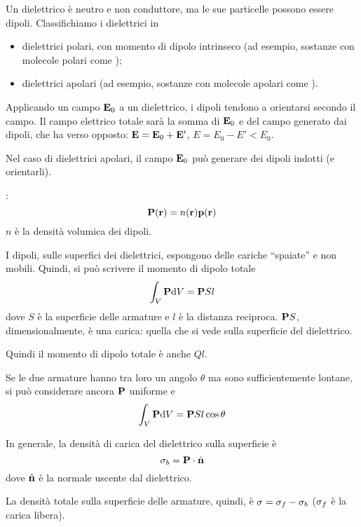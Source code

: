 Un dielettrico è neutro e non conduttore, ma le sue particelle possono essere dipoli.
Classifichiamo i dielettrici in
\begin{itemize}
    \item dielettrici polari, con momento di dipolo intrinseco (ad esempio, sostanze con molecole polari come );
    \item dielettrici apolari (ad esempio, sostanze con molecole apolari come ).
\end{itemize}

Applicando un campo $\mathbf{E}_0$ a un dielettrico, i dipoli tendono a orientarsi secondo il campo.
Il campo elettrico totale sarà la somma di $\mathbf{E}_0$ e del campo generato dai dipoli, che ha verso opposto: $\mathbf{E} = \mathbf{E}_0 + \mathbf{E}'$, $E = E_0 - E' < E_0$.

Nel caso di dielettrici apolari, il campo $\mathbf{E}_0$ può generare dei dipoli indotti (e orientarli).

:
\begin{equation}
    \mathbf{P}(\mathbf{r}) = n(\mathbf{r}) \mathbf{p}(\mathbf{r})
\end{equation}
$n$ è la densità volumica dei dipoli.

I dipoli, sulle superfici dei dielettrici, espongono delle cariche ``spaiate'' e non mobili.
Quindi, si può scrivere il momento di dipolo totale
\begin{equation}
    \int_V \mathbf{P} \mathrm{d} V = \mathbf{P} S l
\end{equation}
dove $S$ è la superficie delle armature e $l$ è la distanza reciproca.
$\mathbf{P} S$, dimensionalmente, è una carica: quella che si vede sulla superficie del dielettrico.

Quindi il momento di dipolo totale è anche $Ql$.

Se le due armature hanno tra loro un angolo $\theta$ ma sono sufficientemente lontane, si può considerare ancora $\mathbf{P}$ uniforme e
\begin{equation}
    \int_V \mathbf{P} \mathrm{d} V = \mathbf{P} S l \cos \theta
\end{equation}

In generale, la densità di carica del dielettrico sulla superficie è
\begin{equation}
    \sigma_b = \mathbf{P} \cdot \hat{\mathbf{n}}
\end{equation}
dove $\hat{\mathbf{n}}$ è la normale uscente dal dielettrico.

La densità totale sulla superficie delle armature, quindi, è $\sigma = \sigma_f - \sigma_b$ ($\sigma_f$ è la carica libera).

